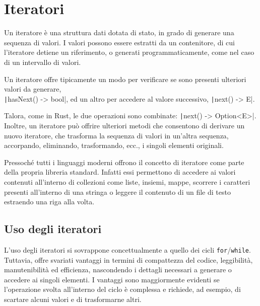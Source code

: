 \section{Iteratori}
Un iteratore è una struttura dati dotata di stato, in grado di generare una sequenza di valori.
I valori possono essere estratti da un contenitore, di cui l'iteratore detiene un riferimento, o
generati programmaticamente, come nel caso di un intervallo di valori.

Un iteratore offre tipicamente un modo per verificare se sono presenti ulteriori valori da generare,\\
\texttt|hasNext() -> bool|,
ed un altro per accedere al valore successivo, \texttt|next() -> E|.


Talora, come in Rust, le due operazioni sono combinate: \texttt|next() -> Option<E>|.
Inoltre, un iteratore può offrire ulteriori metodi che consentono di derivare un nuovo iteratore, che trasforma
la sequenza di valori in un'altra sequenza, accorpando, eliminando, trasformando, ecc., i singoli elementi originali.

Pressoché tutti i linguaggi moderni offrono il concetto di iteratore come parte della propria libreria standard.
Infatti essi permettono di accedere ai valori contenuti all'interno di collezioni come liste, insiemi, mappe, scorrere
i caratteri presenti all'interno di una stringa o leggere il contenuto di un file di testo estraendo una riga alla volta.

\subsection{Uso degli iteratori}
L'uso degli iteratori si sovrappone concettualmente a quello dei cicli \verb|for|/\verb|while|.
Tuttavia, offre svariati vantaggi in termini di compattezza del codice, leggibilità, manutenibilità
ed efficienza, nascondendo i dettagli necessari a generare o accedere ai singoli elementi.
I vantaggi sono maggiormente evidenti se l'operazione svolta all'interno del ciclo è complessa
e richiede, ad esempio, di scartare alcuni valori e di trasformarne altri.

